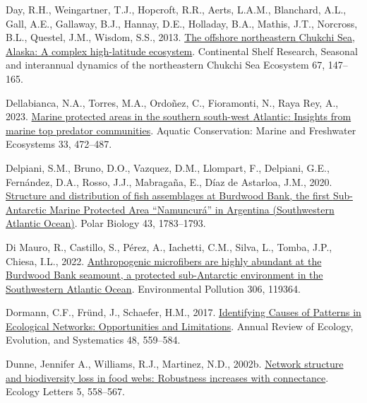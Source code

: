 \documentclass[preprint, 3p,
authoryear]{elsarticle} %
\newlength{\cslhangindent}
\newlength{\cslentryspacingunit} %
\newenvironment{CSLReferences}[2] %
 {%
  \setlength{\parindent}{0pt}
  \ifodd #1
  \let\oldpar\par
  \def\par{\hangindent=\cslhangindent\oldpar}
  \fi
  \setlength{\parskip}{#2\cslentryspacingunit}
 }%
 {}
\begin{document}
\begin{CSLReferences}{1}{0}
\leavevmode{}%
Day, R.H., Weingartner, T.J., Hopcroft, R.R., Aerts, L.A.M., Blanchard,
A.L., Gall, A.E., Gallaway, B.J., Hannay, D.E., Holladay, B.A., Mathis,
J.T., Norcross, B.L., Questel, J.M., Wisdom, S.S., 2013.
\href{https://doi.org/10.1016/j.csr.2013.02.002}{The offshore
northeastern {Chukchi Sea}, {Alaska}: {A} complex high-latitude
ecosystem}. Continental Shelf Research, Seasonal and interannual
dynamics of the northeastern {Chukchi Sea Ecosystem} 67, 147--165.

\leavevmode{}%
Dellabianca, N.A., Torres, M.A., Ordoñez, C., Fioramonti, N., Raya Rey,
A., 2023. \href{https://doi.org/10.1002/aqc.3935}{Marine protected areas
in the southern south-west {Atlantic}: {Insights} from marine top
predator communities}. Aquatic Conservation: Marine and Freshwater
Ecosystems 33, 472--487.

\leavevmode{}%
Delpiani, S.M., Bruno, D.O., Vazquez, D.M., Llompart, F., Delpiani,
G.E., Fernández, D.A., Rosso, J.J., Mabragaña, E., Díaz de Astarloa,
J.M., 2020. \href{https://doi.org/10.1007/s00300-020-02744-w}{Structure
and distribution of fish assemblages at {Burdwood Bank}, the first
{Sub-Antarctic Marine Protected Area} {``{Namuncurá}''} in {Argentina}
({Southwestern Atlantic Ocean})}. Polar Biology 43, 1783--1793.

\leavevmode{}%
Di Mauro, R., Castillo, S., Pérez, A., Iachetti, C.M., Silva, L., Tomba,
J.P., Chiesa, I.L., 2022.
\href{https://doi.org/10.1016/j.envpol.2022.119364}{Anthropogenic
microfibers are highly abundant at the {Burdwood Bank} seamount, a
protected sub-{Antarctic} environment in the {Southwestern Atlantic
Ocean}}. Environmental Pollution 306, 119364.

\leavevmode{}%
Dormann, C.F., Fründ, J., Schaefer, H.M., 2017.
\href{https://doi.org/10.1146/annurev-ecolsys-110316-022928}{Identifying
{Causes} of {Patterns} in {Ecological Networks}: {Opportunities} and
{Limitations}}. Annual Review of Ecology, Evolution, and Systematics 48,
559--584.

\leavevmode{}%
Dunne, Jennifer A., Williams, R.J., Martinez, N.D., 2002b.
\href{https://doi.org/10.1046/j.1461-0248.2002.00354.x}{Network
structure and biodiversity loss in food webs: Robustness increases with
connectance}. Ecology Letters 5, 558--567.


\end{CSLReferences}
\end{document}

